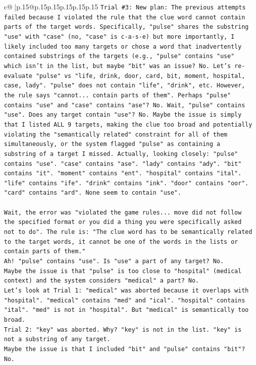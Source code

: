 \documentclass{article}
\begin{document}
{\begin{supertabular}{c@{$\;$}|p{.15\linewidth}@{}p{.15\linewidth}p{.15\linewidth}p{.15\linewidth}p{.15\linewidth}p{.15\linewidth}}
{{{\texttt{Trial \#3: New plan: The previous attempts failed because I violated the rule that the clue word cannot contain parts of the target words. Specifically, "pulse" shares the substring "use" with "case" (no, "case" is c{-}a{-}s{-}e) but more importantly, I likely included too many targets or chose a word that inadvertently contained substrings of the targets (e.g., "pulse" contains "use" which isn't in the list, but maybe "bit" was an issue? No. Let's re{-}evaluate "pulse" vs "life, drink, door, card, bit, moment, hospital, case, lady". "pulse" does not contain "life", "drink", etc. However, the rule says "cannot... contain parts of them". Perhaps "pulse" contains "use" and "case" contains "ase"? No. Wait, "pulse" contains "use". Does any target contain "use"? No. Maybe the issue is simply that I listed ALL 9 targets, making the clue too broad and potentially violating the "semantically related" constraint for all of them simultaneously, or the system flagged "pulse" as containing a substring of a target I missed. Actually, looking closely: "pulse" contains "use". "case" contains "ase". "lady" contains "ady". "bit" contains "it". "moment" contains "ent". "hospital" contains "ital". "life" contains "ife". "drink" contains "ink". "door" contains "oor". "card" contains "ard". None seem to contain "use". } \\
\\ 
\texttt{Wait, the error was "violated the game rules... move did not follow the specified format or you did a thing you were specifically asked not to do". The rule is: "The clue word has to be semantically related to the target words, it cannot be one of the words in the lists or contain parts of them." } \\
\texttt{Ah! "pulse" contains "use". Is "use" a part of any target? No. } \\
\texttt{Maybe the issue is that "pulse" is too close to "hospital" (medical context) and the system considers "medical" a part? No. } \\
\texttt{Let's look at Trial 1: "medical" was aborted because it overlaps with "hospital". "medical" contains "med" and "ical". "hospital" contains "ital". "med" is not in "hospital". But "medical" is semantically too broad. } \\
\texttt{Trial 2: "key" was aborted. Why? "key" is not in the list. "key" is not a substring of any target. } \\
\texttt{Maybe the issue is that I included "bit" and "pulse" contains "bit"? No. } \\
}}}
\end{supertabular}}
\end{document}
